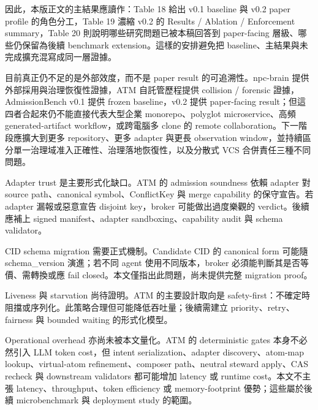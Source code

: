 \documentclass[a4paper,fontset=none]{ctexart}
\begin{document}
因此，本版正文的主結果應讀作：Table 18 給出 v0.1 baseline 與 v0.2 paper profile 的角色分工，Table 19 濃縮 v0.2 的 Results / Ablation / Enforcement summary，Table 20 則說明哪些研究問題已被本稿回答到 paper-facing 層級、哪些仍保留為後續 benchmark extension。這樣的安排避免把 baseline、主結果與未完成擴充混寫成同一層證據。

目前真正仍不足的是外部效度，而不是 paper result 的可追溯性。npc-brain 提供外部採用與治理恢復性證據，ATM 自託管歷程提供 collision / forensic 證據，AdmissionBench v0.1 提供 frozen baseline，v0.2 提供 paper-facing result；但這四者合起來仍不能直接代表大型企業 monorepo、polyglot microservice、高頻 generated-artifact workflow，或跨電腦多 clone 的 remote collaboration。下一階段應擴大到更多 repository、更多 adapter 與更長 observation window，並持續區分單一治理域准入正確性、治理落地恢復性，以及分散式 VCS 合併責任三種不同問題。

Adapter trust 是主要形式化缺口。ATM 的 admission soundness 依賴 adapter 對 source path、canonical symbol、ConflictKey 與 merge capability 的保守宣告。若 adapter 漏報或惡意宣告 disjoint key，broker 可能做出過度樂觀的 verdict。後續應補上 signed manifest、adapter sandboxing、capability audit 與 schema validator。

CID schema migration 需要正式機制。Candidate CID 的 canonical form 可能隨 schema\_version 演進；若不同 agent 使用不同版本，broker 必須能判斷其是否等價、需轉換或應 fail closed。本文僅指出此問題，尚未提供完整 migration proof。

Liveness 與 starvation 尚待證明。ATM 的主要設計取向是 safety-first：不確定時阻擋或序列化。此策略合理但可能降低吞吐量；後續需建立 priority、retry、fairness 與 bounded waiting 的形式化模型。

Operational overhead 亦尚未被本文量化。ATM 的 deterministic gates 本身不必然引入 LLM token cost，但 intent serialization、adapter discovery、atom-map lookup、virtual-atom refinement、composer path、neutral steward apply、CAS recheck 與 downstream validators 都可能增加 latency 或 runtime cost。本文不主張 latency、throughput、token efficiency 或 memory-footprint 優勢；這些屬於後續 microbenchmark 與 deployment study 的範圍。
\end{document}
